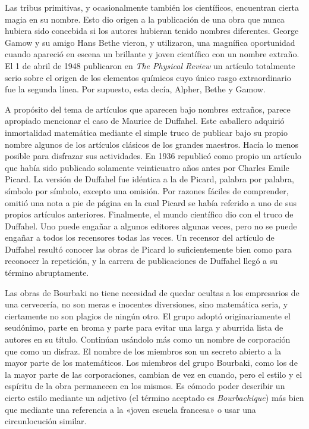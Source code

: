 \documentclass[a4paper, 12pt]{article}
\begin{document}
Las tribus primitivas, y ocasionalmente también los 
científicos, encuentran cierta magia en su nombre. Esto dio origen a la 
publicación de una obra que nunca hubiera sido concebida si los autores 
hubieran tenido nombres diferentes. George Gamow y su amigo Hans Bethe 
vieron, y utilizaron, una magnífica oportunidad cuando apareció en 
escena un brillante y joven científico con un nombre extraño. El 1 
de abril de 1948 publicaron en {\it The Physical Review} un artículo 
totalmente serio sobre el origen de los elementos químicos cuyo 
único rasgo extraordinario fue la segunda línea. Por supuesto, esta 
decía, Alpher, Bethe y Gamow. 

A propósito del tema de artículos que aparecen bajo nombres 
extraños, parece apropiado mencionar el caso de Maurice de Duffahel. 
Este caballero adquirió inmortalidad matemática mediante el simple 
truco de publicar bajo su propio nombre algunos de los artículos 
clásicos de los grandes maestros. Hacía lo menos posible para 
disfrazar sus actividades. En 1936 republicó como propio un 
artículo que había sido publicado solamente veinticuatro años 
antes por Charles Emile Picard. La versión de Duffahel fue idéntica 
a la de Picard, palabra por palabra, símbolo por símbolo, excepto 
una omisión. Por razones fáciles de comprender, omitió una nota 
a pie de página en la cual Picard se había referido a uno de sus 
propios artículos anteriores. Finalmente, el mundo científico dio 
con el truco de Duffahel. Uno puede engañar a algunos editores algunas 
veces, pero no se puede engañar a todos los recensores todas las veces. 
Un recensor del artículo de Duffahel resultó conocer las obras de 
Picard lo suficientemente bien como para reconocer la repetición, y la 
carrera de publicaciones de Duffahel llegó a su término 
abruptamente. 

Las obras de Bourbaki no tiene necesidad de quedar ocultas a los 
empresarios de una cervecería, no son meras e inocentes diversiones, 
sino matemática seria, y ciertamente no son plagios de ningún otro. 
El grupo adoptó originariamente el seudónimo, parte en broma y parte 
para evitar una larga y aburrida lista de autores en su título. 
Continúan usándolo más como un nombre de corporación que 
como un disfraz. El nombre de los miembros son un secreto abierto a la mayor 
parte de los matemáticos. Los miembros del grupo Bourbaki, como los de 
la mayor parte de las corporaciones, cambian de vez en cuando, pero el 
estilo y el espíritu de la obra permanecen en los mismos. Es cómodo 
poder describir un cierto estilo mediante un adjetivo (el término 
aceptado es {\it Bourbachique}) más bien que mediante una referencia a la 
«joven escuela francesa» o usar una circunlocución similar. 
\end{document}
